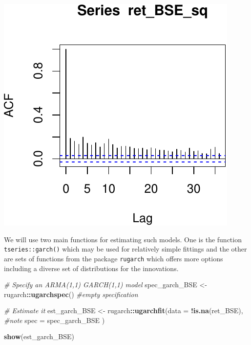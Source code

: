\documentclass[11pt,]{article}
\newenvironment{Shaded}{\begin{snugshade}}{\end{snugshade}}
\newcommand{\KeywordTok}[1]{\textcolor[rgb]{0.13,0.29,0.53}{\textbf{#1}}}
\newcommand{\DataTypeTok}[1]{\textcolor[rgb]{0.13,0.29,0.53}{#1}}
\newcommand{\StringTok}[1]{\textcolor[rgb]{0.31,0.60,0.02}{#1}}
\newcommand{\CommentTok}[1]{\textcolor[rgb]{0.56,0.35,0.01}{\textit{#1}}}
\newcommand{\OperatorTok}[1]{\textcolor[rgb]{0.81,0.36,0.00}{\textbf{#1}}}
\newcommand{\NormalTok}[1]{#1}
\begin{document}
\begin{center}\includegraphics{FMC_T4_PhD_ARMA_GARCH_files/figure-latex/BSE_fit_ARMA_GARCH_ACF-3} \end{center}

We will use two main functions for estimating such models. One is the
function \texttt{tseries::garch()} which may be used for relatively
simple fittings and the other are sets of functions from the package
\texttt{rugarch} which offers more options including a diverse set of
distributions for the innovations.

\begin{Shaded}
\begin{Highlighting}[]
\CommentTok{# Specify an ARMA(1,1) GARCH(1,1) model}
\NormalTok{spec_garch_BSE <-}\StringTok{ }\NormalTok{rugarch}\OperatorTok{::}\KeywordTok{ugarchspec}\NormalTok{() }\CommentTok{#empty specification}

\CommentTok{# Estimate it}
\NormalTok{est_garch_BSE <-}\StringTok{ }\NormalTok{rugarch}\OperatorTok{::}\KeywordTok{ugarchfit}\NormalTok{(}\DataTypeTok{data =} \OperatorTok{!}\KeywordTok{is.na}\NormalTok{(ret_BSE), }\CommentTok{#note}
                                    \DataTypeTok{spec =}\NormalTok{ spec_garch_BSE}
\NormalTok{                                    )}

\KeywordTok{show}\NormalTok{(est_garch_BSE)}
\end{Highlighting}
\end{Shaded}
\end{document}
